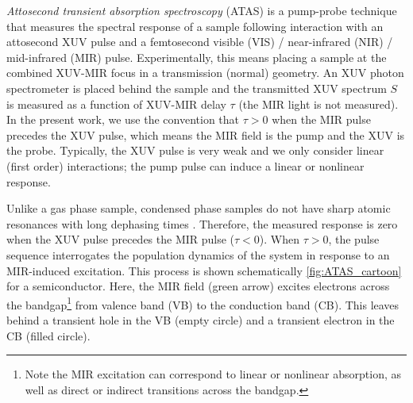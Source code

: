 \textit{Attosecond transient absorption spectroscopy} (ATAS) is a pump-probe technique that measures the spectral response of a sample following interaction with an attosecond XUV pulse and a femtosecond visible (VIS) / near-infrared (NIR) / mid-infrared (MIR) pulse. Experimentally, this means placing a sample at the combined XUV-MIR focus in a transmission (normal) geometry. An XUV photon spectrometer is placed behind the sample and the transmitted XUV spectrum $S$ is measured as a function of XUV-MIR delay $\tau$ (the MIR light is not measured). In the present work, we use the convention that $\tau>0$ when the MIR pulse precedes the XUV pulse, which means the MIR field is the pump and the XUV is the probe. Typically, the XUV pulse is very weak and we only consider linear (first order) interactions; the pump pulse can induce a linear or nonlinear response.

Unlike a gas phase sample, condensed phase samples do not have sharp atomic resonances with long dephasing times \cite{ramaseshaRealTimeProbingElectron2016}. Therefore, the measured response is zero when the XUV pulse precedes the MIR pulse ($\tau<0$). When $\tau>0$, the pulse sequence interrogates the population dynamics of the system in response to an MIR-induced excitation. This process is shown schematically \cref{fig:ATAS_cartoon} for a semiconductor. Here, the MIR field (green arrow) excites electrons across the bandgap\footnote{Note the MIR excitation can correspond to linear or nonlinear absorption, as well as direct or indirect transitions across the bandgap.} from valence band (VB) to the conduction band (CB). This leaves behind a transient hole in the VB (empty circle) and a transient electron in the CB (filled circle). 

